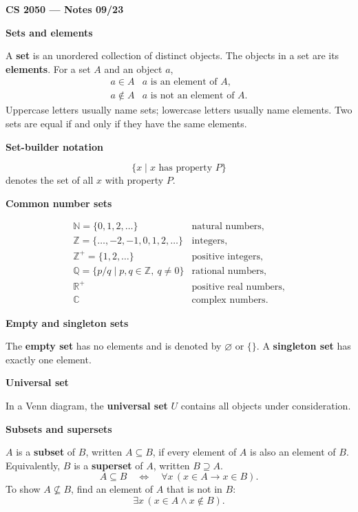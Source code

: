 \documentclass[letterpaper]{article}
\newcommand{\noteheader}[1]{\par\bigskip\noindent\textbf{#1}\par\medskip}
\begin{document}
\textbf{CS 2050 --- Notes 09/23}

\noteheader{Sets and elements}

A \textbf{set} is an unordered collection of distinct objects. The objects
in a set are its \textbf{elements}. For a set $A$ and an object $a$,
\[
\begin{array}{ll}
a\in A & a\text{ is an element of }A,\\[2pt]
a\notin A & a\text{ is not an element of }A.
\end{array}
\]
Uppercase letters usually name sets; lowercase letters usually name elements.
Two sets are equal if and only if they have the same elements.

\noteheader{Set-builder notation}

\[
\{x\mid x\text{ has property }P\}
\]
denotes the set of all $x$ with property $P$.

\noteheader{Common number sets}

\[
\begin{array}{ll}
\mathbb N=\{0,1,2,\ldots\} & \text{natural numbers},\\[3pt]
\mathbb Z=\{\ldots,-2,-1,0,1,2,\ldots\} & \text{integers},\\[3pt]
\mathbb Z^+=\{1,2,\ldots\} & \text{positive integers},\\[3pt]
\mathbb Q=\{p/q\mid p,q\in\mathbb Z,\ q\ne0\} & \text{rational numbers},\\[3pt]
\mathbb R^+ & \text{positive real numbers},\\[3pt]
\mathbb C & \text{complex numbers}.
\end{array}
\]

\clearpage

\noteheader{Empty and singleton sets}

The \textbf{empty set} has no elements and is denoted by $\varnothing$ or
$\{\}$. A \textbf{singleton set} has exactly one element.

\noteheader{Universal set}

In a Venn diagram, the \textbf{universal set} $U$ contains all objects under
consideration.

\noteheader{Subsets and supersets}

$A$ is a \textbf{subset} of $B$, written $A\subseteq B$, if every element
of $A$ is also an element of $B$. Equivalently, $B$ is a \textbf{superset}
of $A$, written $B\supseteq A$.
\[
A\subseteq B\quad\Longleftrightarrow\quad
\forall x\,(x\in A\to x\in B).
\]
To show $A\not\subseteq B$, find an element of $A$ that is not in $B$:
\[
\exists x\,(x\in A\land x\notin B).
\]
\end{document}
